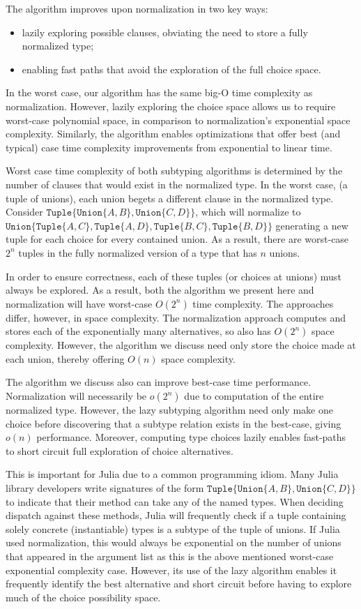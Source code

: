 \documentclass[a4paper,english]{lipics-v2019}
\newcommand{\xt}[1]{\texttt{#1}}
\newcommand{\union}[2]{\xt{Union\{}#1,#2\xt{\}}}
\newcommand{\tuple}[1]{\xt{Tuple\{}#1\xt{\}}}
\begin{document}
The algorithm improves upon normalization in two key ways:
\begin{itemize}
  \item lazily exploring possible clauses, obviating the need to store a
    fully normalized type;
  \item enabling fast paths that avoid the exploration of the full choice space.
\end{itemize}

\noindent
In the worst case, our algorithm has the same big-O time complexity as
normalization. However, lazily exploring the choice space allows us to
require worst-case polynomial space, in comparison to normalization's
exponential space complexity.  Similarly, the algorithm enables
optimizations that offer best (and typical) case time complexity
improvements from exponential to linear time.

Worst case time complexity of both subtyping algorithms is determined by the
number of clauses that would exist in the normalized type. In the worst case,
(a tuple of unions), each union begets a different clause in the normalized
type. Consider $\tuple{\union{A}{B}, \union{C}{D}}$, which will normalize to
$\union{\tuple{A,C}}{\tuple{A, D}, \tuple{B, C}, \tuple{B, D}}$ generating a 
new tuple for each choice for every contained union. As a result, there are
worst-case $2^n$ tuples in the fully normalized version of a type that has $n$
unions.

In order to ensure correctness, each of these tuples (or choices at unions)
must always be explored. As a result, both the algorithm we present here and
normalization will have worst-case $O(2^n)$ time complexity. The approaches
differ, however, in space complexity. The normalization approach computes and
stores each of the exponentially many alternatives, so also has $O(2^n)$ space
complexity. However, the algorithm we discuss need only store the choice made
at each union, thereby offering $O(n)$ space complexity.

The algorithm we discuss also can improve best-case time performance.
Normalization will necessarily be $o(2^n)$ due to computation of the entire
normalized type. However, the lazy subtyping algorithm need only make one
choice before discovering that a subtype relation exists in the best-case,
giving $o(n)$ performance. Moreover, computing type choices lazily enables
fast-paths to short circuit full exploration of choice alternatives.

This is important for Julia due to a common programming idiom. Many Julia
library developers write signatures of the form $\tuple{\union{A}{B},
\union{C}{D}}$ to indicate that their method can take any of the named
types. When deciding dispatch against these methods, Julia will frequently
check if a tuple containing solely concrete (instantiable) types is a subtype 
of the tuple of unions. If Julia used normalization, this would always be 
exponential on the number of unions that appeared in the argument list as this
is the above mentioned worst-case exponential complexity case. However, its use
of the lazy algorithm enables it frequently identify the best alternative and
short circuit before having to explore much of the choice possibility space.
\end{document}
